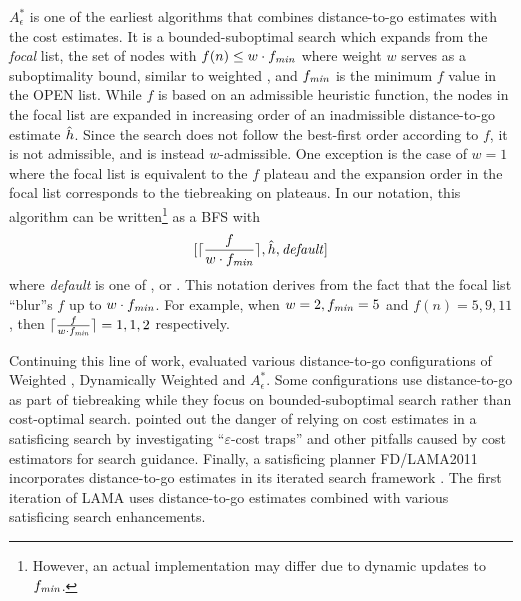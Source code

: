 $A^*_\epsilon$ \cite{pearl1982studies} is one of
the earliest algorithms that combines distance-to-go estimates with the cost estimates. It is a bounded-suboptimal
search which expands from the \emph{focal} list, the set of nodes with $f(n)\leq w\cdot f_{\mit{min}}$ where weight $w$ serves as a suboptimality bound, similar to weighted \astar, 
 and $f_{\mit{min}}$ is the minimum $f$ value in the OPEN list.  While $f$
is based on an admissible heuristic function, the nodes in the focal list are expanded in increasing order of
an inadmissible distance-to-go estimate $\hh$. Since the search does not follow the best-first order according to $f$, it is 
not admissible, and is instead $w$-admissible. One exception is the case of $w=1$ where the focal list is equivalent
to the $f$ plateau and the expansion order in the focal list corresponds to the tiebreaking on plateaus. In our
notation, this algorithm can be written\footnote{
However, an actual implementation may differ due to dynamic updates to $f_{\mit{min}}$.}
as a BFS with
\[
 [ \lceil \frac{f}{w\cdot f_{\mit{min}}} \rceil, \hh, \mit{default}]
\]
where \textit{default} is one of \fifo, \lifo or \ro.
This notation derives from the fact that the focal list ``blur''s $f$ up to $w\cdot f_{\mit{min}}$.
For example, when $w=2, f_{\mit{min}}=5$ and
$f(n)=5,9,11$, then $\lceil \frac{f}{w\cdot f_{\mit{min}}} \rceil=1,1,2$ respectively. 

Continuing this line of work,  \citeyear{thayer2009using,thayer2011bounded}
evaluated various distance-to-go configurations of Weighted
\astar, Dynamically Weighted \astar \cite{pohl1973avoidance} and $A^*_\epsilon$.
Some configurations use distance-to-go as part of
tiebreaking while they focus on bounded-suboptimal search rather than cost-optimal search.
% 
 \citeyear{cushing2010cost} pointed out the danger of relying  %
on cost estimates in a satisficing search by investigating ``$\varepsilon$-cost traps'' and other pitfalls caused by
cost estimators for search guidance. %
% 
Finally, a \sota satisficing planner FD/LAMA2011 incorporates distance-to-go estimates in its iterated search
framework \cite{richter2011lama}. The first iteration of LAMA uses distance-to-go estimates combined with various satisficing
search enhancements.

